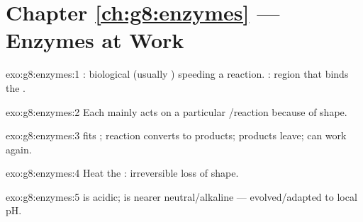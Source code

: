 \section*{Chapter \ref{ch:g8:enzymes} --- Enzymes at Work}

\begin{solution}{exo:g8:enzymes:1}
: biological  (usually ) speeding a reaction.
: region that binds the .
\end{solution}

\begin{solution}{exo:g8:enzymes:2}
Each  mainly acts on a particular /reaction because of
 shape.
\end{solution}

\begin{solution}{exo:g8:enzymes:3}
 fits ; reaction converts  to products;
products leave;  can work again.
\end{solution}

\begin{solution}{exo:g8:enzymes:4}
Heat  the : irreversible loss of  shape.
\end{solution}

\begin{solution}{exo:g8:enzymes:5}
 is acidic;  is nearer neutral/alkaline --- 
evolved/adapted to local pH.
\end{solution}

